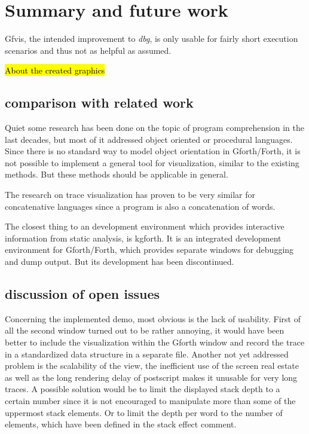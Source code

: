 \chapter{Summary and future work}
\label{chap:Summary}

Gfvis, the intended improvement to \emph{dbg}, is only usable for fairly short execution scenarios and thus not as helpful as assumed.

\hl{About the created graphics}

\section{comparison with related work}

Quiet some research has been done on the topic of program comprehension in the last decades, but most of it addressed object oriented or procedural languages. Since there is no standard way to model object orientation in Gforth/Forth, it is not possible to implement a general tool for visualization, similar to the existing methods. But these methods should be applicable in general.

The research on trace visualization has proven to be very similar for concatenative languages since a program is also a concatenation of words.

The closest thing to an development environment which provides interactive information from static analysis, is kgforth. It is an integrated development environment for Gforth/Forth, which provides separate windows for debugging and dump output. But its development has been discontinued.

\section{discussion of open issues}

Concerning the implemented demo, most obvious is the lack of usability. First of all the second window turned out to be rather annoying, it would have been better to include the visualization within the Gforth window and record the trace in a standardized data structure in a separate file.
Another not yet addressed problem is the scalability of the view, the inefficient use of the screen real estate as well as the long rendering delay of postscript makes it unusable for very long traces. A possible solution would be to limit the displayed stack depth to a certain number since it is not encouraged to manipulate more than some of the uppermost stack elements. Or to limit the depth per word to the number of elements, which have been defined in the stack effect comment.

